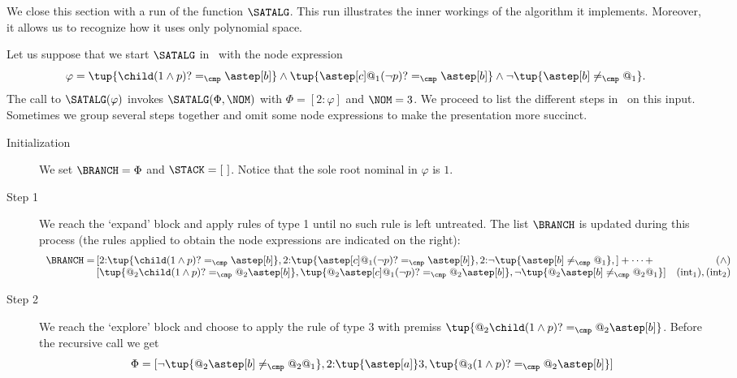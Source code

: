 We close this section with a run of the function $\SATALG$.
This run illustrates the inner workings of the algorithm it implements.
Moreover, it allows us to recognize how it uses only polynomial space.

\begin{exa}
Let us suppose that we start $\SATALG$ in~ with the node expression
\[
    \varphi = \tup{\child(1\land p)? =_\cmp \astep[b]} \land \tup{\astep[c]@_1(\neg p)? =_\cmp \astep[b]}  \land \neg\tup{\astep[b]\neq_\cmp @_1}.
\]   
The call to $\SATALG(\varphi)$ invokes $\SATALG(\Phi,\NOM)$ with $\Phi=[2{:}\varphi]$ and  $\NOM=3$.
We proceed to list the different steps in~ on this input.
Sometimes we group several steps together and omit some node expressions to make the presentation more succinct. 

\begin{description}
  \item[Initialization] 
    We set $\BRANCH=\Phi$ and $\STACK=[~]$.
    Notice that the sole root nominal in $\varphi$ is $1$.

  \item[Step 1] 
    We reach the `expand' block and apply rules of type 1 until no such rule is left untreated.
    The list $\BRANCH$ is updated during this process (the rules applied to obtain the node expressions are indicated on the right):
    \[
      \begin{array}{r@{\,}@{}lr}
        \BRANCH =
          & [
              2{:}\tup{\child(1\land p)? =_\cmp \astep[b]},
              2{:}\tup{\astep[c]@_1(\neg p)? =_\cmp \astep[b]},
              2{:}\neg\tup{\astep[b]\neq_\cmp @_1},
          ] + \dots +
              & (\land) \\
          & [
              \tup{@_2\child(1\land p)? =_\cmp @_2\astep[b]},
              \tup{@_2\astep[c]@_1(\neg p)? =_\cmp @_2\astep[b]},
              \neg\tup{@_2\astep[b]\neq_\cmp @_2@_1}
            ]
              & (\text{int}_1), (\text{int}_2)
      \end{array}
    \]

  \item[Step 2]
    We reach the `explore' block and choose to apply the rule of type 3 with premiss $\tup{@_2\child(1\land p)? =_\cmp @_2\astep[b]}$.
    Before the recursive call we get
    \[
      \Phi =
        [
          \neg\tup{@_2\astep[b]\neq_\cmp @_2@_1}, 2{:}\tup{\astep[a]}3, \tup{@_3(1\land p)? =_\cmp @_2\astep[b]}
        ]
    \]


\end{description}
\end{exa}
